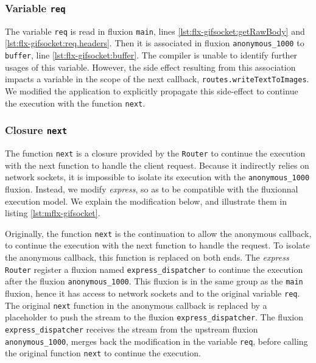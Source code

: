 \subsubsection{Variable \texttt{req}}

The variable \texttt{req} is read in fluxion \texttt{main}, lines \ref{lst:flx-gifsocket:getRawBody} and \ref{lst:flx-gifsocket:req.headers}.
Then it is associated in fluxion \texttt{anonymous\_1000} to \texttt{buffer}, line \ref{lst:flx-gifsocket:buffer}.
The compiler is unable to identify further usages of this variable.
However, the side effect resulting from this association impacts a variable in the scope of the next callback, \texttt{routes.writeTextToImages}.
We modified the application to explicitly propagate this side-effect to continue the execution with the function \texttt{next}.


\subsubsection{Closure \texttt{next}}

The function \texttt{next} is a closure provided by the \texttt{Router} to continue the execution with the next function to handle the client request.
Because it indirectly relies on network sockets, it is impossible to isolate its execution with the \texttt{anonymous\-\_1000} fluxion.
Instead, we modify \textit{express}, so as to be compatible with the fluxionnal execution model.
We explain the modification below, and illustrate them in listing \ref{lst:mflx-gifsocket}.

Originally, the function \texttt{next} is the continuation to allow the anonymous callback, to continue the execution with the next function to handle the request.
To isolate the anonymous callback, this function is replaced on both ends.
The \textit{express} \texttt{Router} register a fluxion named \texttt{express\_dispatcher} to continue the execution after the fluxion \texttt{anonymous\-\_1000}.
This fluxion is in the same group as the \texttt{main} fluxion, hence it has access to network sockets and to the original variable \texttt{req}.
The original \texttt{next} function in the anonymous callback is replaced by a placeholder to push the stream to the fluxion \texttt{express\_dispatcher}.
The fluxion \texttt{express\_dispatcher} receives the stream from the upstream fluxion \texttt{anonymous\-\_1000}, merges back the modification in the variable \texttt{req}, before calling the original function \texttt{next} to continue the execution.


